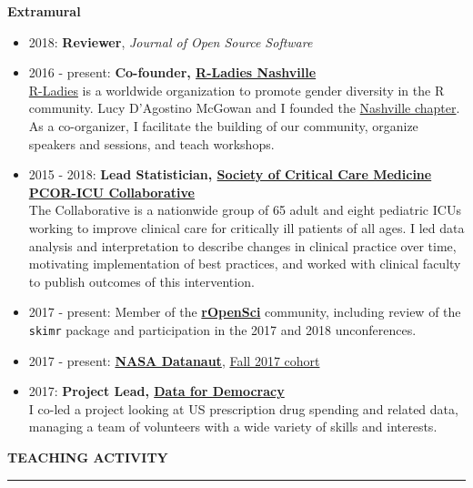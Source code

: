 \documentclass[5pt]{article}
\begin{document}
\noindent \textbf{Extramural}
\begin{itemize}
\item 2018: \textbf{Reviewer}, \emph{Journal of Open Source Software}
\item 2016 - present: \textbf{Co-founder, \href{https://www.meetup.com/rladies-nashville}{R-Ladies Nashville}}\\
\indent \href{http://www.rladies.org}{R-Ladies} is a worldwide organization to promote gender diversity in the R community. Lucy D'Agostino McGowan and I founded the \href{https://www.meetup.com/rladies-nashville}{Nashville chapter}.  As a co-organizer, I facilitate the building of our community, organize speakers and sessions, and teach workshops.
\item 2015 - 2018: \textbf{Lead Statistician, \href{www.iculiberation.org}{Society of Critical Care Medicine PCOR-ICU Collaborative}}\\
\indent The Collaborative is a nationwide group of 65 adult and eight pediatric ICUs working to improve clinical care for critically ill patients of all ages. I led data analysis and interpretation to describe changes in clinical practice over time, motivating implementation of best practices, and worked with clinical faculty to publish outcomes of this intervention.
\item 2017 - present: Member of the  \textbf{\href{https://ropensci.org}{rOpenSci}} community, including review of the \texttt{skimr} package and participation in the 2017 and 2018 unconferences.
\item 2017 - present: \textbf{\href{https://open.nasa.gov/explore/datanauts/}{NASA Datanaut}}, \href{https://open.nasa.gov/explore/datanauts/2017/fall/}{Fall 2017 cohort}
\item 2017: \textbf{Project Lead, \href{http://datafordemocracy.org}{Data for Democracy}}\\ I co-led a project looking at US prescription drug spending and related data, managing a team of volunteers with a wide variety of skills and interests.
\end{itemize}

\clearpage
\noindent \linebreak \textbf{TEACHING ACTIVITY}\\
\rule[5pt]{\linewidth}{1.0pt}
\end{document}
